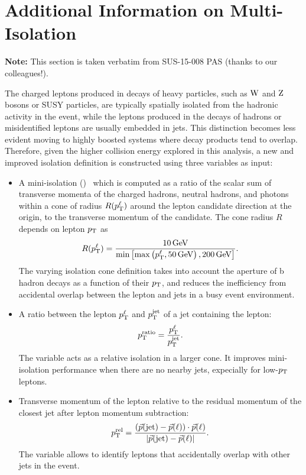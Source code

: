 \chapter{Additional Information on Multi-Isolation}
\label{app:MultiIso}

\textbf{Note:} This section is taken verbatim from SUS-15-008 PAS \cite{CMS-PAS-SUS-15-008} (thanks to our colleagues!).

The charged leptons produced in decays of heavy particles, such as $\mathrm{W}$ and $\mathrm{Z}$ bosons 
or SUSY particles, are typically spatially isolated from the hadronic activity in the event,
while the leptons produced in the decays of hadrons or misidentified leptons are usually
embedded in jets. This distinction becomes less evident moving to
highly boosted systems where decay products tend to overlap.
Therefore, given the higher collision energy explored in this analysis, a new and improved isolation definition is constructed using three variables as input:

\begin{itemize}
\item A mini-isolation (\miniIso)~\cite{Rehermann:2010vq} which is computed as a ratio of the scalar sum of transverse momenta 
of the charged hadrons, neutral hadrons, and photons within a cone of radius $R (p_{\mathrm{T}}^\ell)$ around the lepton 
candidate direction at the origin, to the transverse momentum of the candidate. The cone radius $R$
depends on lepton $p_{\mathrm{T}}$ as 
 \begin{equation}
R(p_{\mathrm{T}}^\ell) = \dfrac{10\,\text{Ge\hspace{-.08em}V}}{\min\left[\max\left(p_{\mathrm{T}}^\ell, 50\,\text{Ge\hspace{-.08em}V}\right), 200\,\text{Ge\hspace{-.08em}V}\right]}.
  \end{equation}
The varying isolation cone definition takes into account the aperture of b hadron decays as a function of
their $p_{\mathrm{T}}$, and reduces the inefficiency from accidental overlap between the lepton and jets 
in a busy event environment.
\item A ratio between the lepton $p_{\mathrm{T}}^\ell$ and $p_{\mathrm{T}}^\text{jet}$ of a jet containing the lepton: 
 \begin{equation}
p_{\mathrm{T}}^\text{ratio} = \dfrac{p_{\mathrm{T}}^\ell}{p_{\mathrm{T}}^\text{jet}}.
  \end{equation}
The \ptRatio variable acts as a relative isolation in 
a larger cone. It improves mini-isolation performance when there
are no nearby jets, expecially for low-$p_{\mathrm{T}}$ leptons. %
\item Transverse momentum of the lepton relative to the residual momentum of the closest jet after lepton momentum subtraction:
  \begin{equation}
    p_{\mathrm{T}}^\text{rel}=\frac{(\vec{p}(\text{jet})-\vec{p}(\ell))\cdot \vec{p}(\ell) }{|\vec{p}(\text{jet})-\vec{p}(\ell)|}.
  \end{equation}
The \ptRel variable allows to identify leptons that accidentally overlap with other jets in the event.
\end{itemize}

